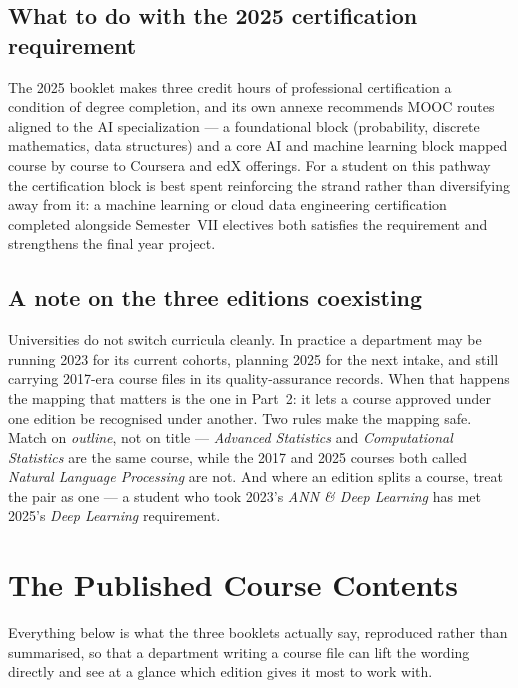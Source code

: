 \documentclass[11pt,a4paper,oneside]{report}
\begin{document}
\subsection{What to do with the 2025 certification requirement}

The 2025 booklet makes three credit hours of professional certification a
condition of degree completion, and its own annexe recommends MOOC routes aligned
to the AI specialization --- a foundational block (probability, discrete
mathematics, data structures) and a core AI and machine learning block mapped
course by course to Coursera and edX offerings. For a student on this pathway the
certification block is best spent reinforcing the strand rather than diversifying
away from it: a machine learning or cloud data engineering certification
completed alongside Semester~VII electives both satisfies the requirement and
strengthens the final year project.

\subsection{A note on the three editions coexisting}

Universities do not switch curricula cleanly. In practice a department may be
running 2023 for its current cohorts, planning 2025 for the next intake, and
still carrying 2017-era course files in its quality-assurance records. When that
happens the mapping that matters is the one in Part~2: it lets a course approved
under one edition be recognised under another. Two rules make the mapping safe.
Match on \emph{outline}, not on title --- \emph{Advanced Statistics} and
\emph{Computational Statistics} are the same course, while the 2017 and 2025
courses both called \emph{Natural Language Processing} are not. And where an
edition splits a course, treat the pair as one --- a student who took 2023's
\emph{ANN \& Deep Learning} has met 2025's \emph{Deep Learning} requirement.

\section{The Published Course Contents}

Everything below is what the three booklets actually say, reproduced rather than
summarised, so that a department writing a course file can lift the wording
directly and see at a glance which edition gives it most to work with.
\end{document}
